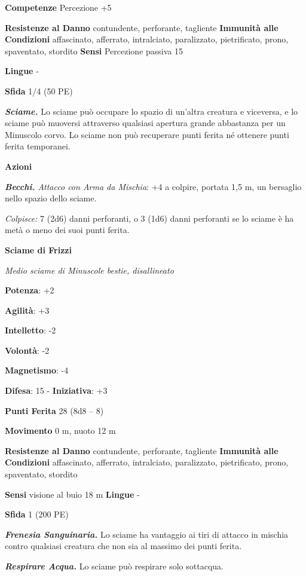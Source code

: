 \begin{multicols}{2}
\textbf{Competenze} Percezione +5

\textbf{Resistenze al Danno} contundente, perforante, tagliente
\textbf{Immunità alle Condizioni} affascinato, afferrato, intralciato,
paralizzato, pietrificato, prono, spaventato, stordito \textbf{Sensi}
Percezione passiva 15

\textbf{Lingue} -

\textbf{Sfida} 1/4 (50 PE)

\emph{\textbf{Sciame.}} Lo sciame può occupare lo spazio di un'altra
creatura e viceversa, e lo sciame può muoversi attraverso qualsiasi
apertura grande abbastanza per un Minuscolo corvo. Lo sciame non può
recuperare punti ferita né ottenere punti ferita temporanei.

\textbf{Azioni}

\emph{\textbf{Becchi.} Attacco con Arma da Mischia}: +4 a colpire,
portata 1,5 m, un bersaglio nello spazio dello sciame.

\emph{Colpisce:} 7 (2d6) danni perforanti, o 3 (1d6) danni perforanti se
lo sciame è ha metà o meno dei suoi punti ferita.



\textbf{Sciame di Frizzi}

\emph{Medio sciame di Minuscole bestie, disallineato}

\textbf{Potenza}: +2

\textbf{Agilità}: +3

\textbf{Intelletto}: -2

\textbf{Volontà}: -2

\textbf{Magnetismo}: -4

\textbf{Difesa}: 15 - \textbf{Iniziativa}: +3

\textbf{Punti Ferita} 28 (8d8 -- 8)

\textbf{Movimento} 0 m, nuoto 12 m

\textbf{Resistenze al Danno} contundente, perforante, tagliente
\textbf{Immunità alle Condizioni} affascinato, afferrato, intralciato,
paralizzato, pietrificato, prono, spaventato, stordito

\textbf{Sensi} visione al buio 18 m
\textbf{Lingue} -

\textbf{Sfida} 1 (200 PE)

\emph{\textbf{Frenesia Sanguinaria.}} Lo sciame ha vantaggio ai tiri di
attacco in mischia contro qualsiasi creatura che non sia al massimo dei
punti ferita.

\emph{\textbf{Respirare Acqua.}} Lo sciame può respirare solo sottacqua.


\end{multicols}
